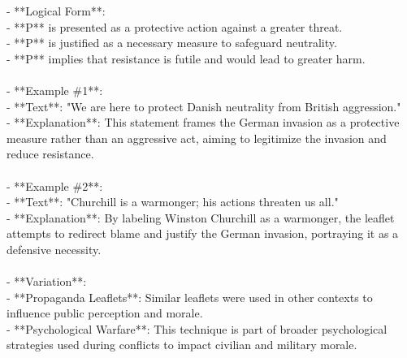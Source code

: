 \documentclass[a4paper,12pt,single,pdftex]{scrbook}
\begin{document}
    
      - **Logical Form**:
    \\

    
        - **P** is presented as a protective action against a greater threat.
    \\

    
        - **P** is justified as a necessary measure to safeguard neutrality.
    \\

    
        - **P** implies that resistance is futile and would lead to greater harm.
    \\

    
      
    \\

    
      - **Example \#1**:
    \\

    
        - **Text**: "We are here to protect Danish neutrality from British aggression."
    \\

    
        - **Explanation**: This statement frames the German invasion as a protective measure rather than an aggressive act, aiming to legitimize the invasion and reduce resistance.
    \\

    
      
    \\

    
      - **Example \#2**:
    \\

    
        - **Text**: "Churchill is a warmonger; his actions threaten us all."
    \\

    
        - **Explanation**: By labeling Winston Churchill as a warmonger, the leaflet attempts to redirect blame and justify the German invasion, portraying it as a defensive necessity.
    \\

    
      
    \\

    
      - **Variation**:
    \\

    
        - **Propaganda Leaflets**: Similar leaflets were used in other contexts to influence public perception and morale.
    \\

    
        - **Psychological Warfare**: This technique is part of broader psychological strategies used during conflicts to impact civilian and military morale.
    \\
\end{document}
